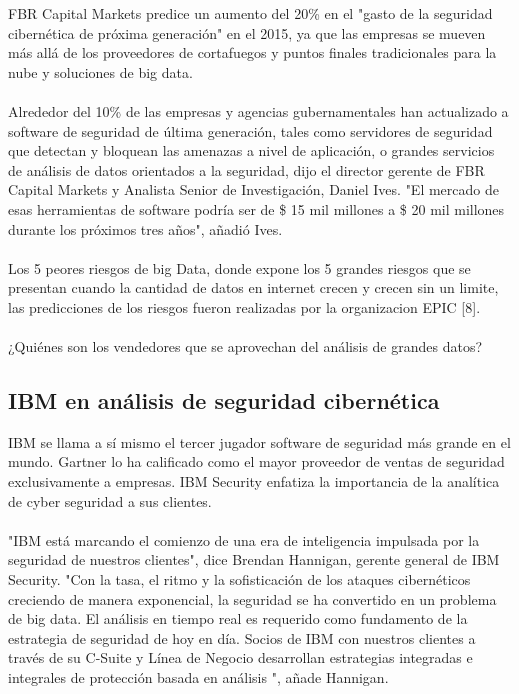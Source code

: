\documentclass[journal]{IEEEtran}
\begin{document}
FBR Capital Markets predice un aumento del 20\% en el "gasto de la seguridad cibernética de próxima generación" en el 2015, ya que las empresas se mueven más allá de los proveedores de cortafuegos y puntos finales tradicionales para la nube y soluciones de big data.\\ \\
Alrededor del 10\% de las empresas y agencias gubernamentales han actualizado a software de seguridad de última generación, tales como servidores de seguridad que detectan y bloquean las amenazas a nivel de aplicación, o grandes servicios de análisis de datos orientados a la seguridad, dijo el director gerente de FBR Capital Markets y Analista Senior de Investigación, Daniel Ives. "El mercado de esas herramientas de software podría ser de \$ 15 mil millones a \$ 20 mil millones durante los próximos tres años", añadió Ives.\\ \\
Los 5 peores riesgos de big Data, donde expone los 5 grandes riesgos que se presentan cuando la cantidad de datos en internet crecen y crecen sin un limite, las predicciones de los riesgos fueron realizadas por la organizacion EPIC [8].\\ \\
¿Quiénes son los vendedores que se aprovechan del análisis de grandes datos?
\subsection{IBM en análisis de seguridad cibernética}
IBM se llama a sí mismo el tercer jugador software de seguridad más grande en el mundo. Gartner lo ha calificado como el mayor proveedor de ventas de seguridad exclusivamente a empresas. IBM Security enfatiza la importancia de la analítica de cyber seguridad a sus clientes.\\ \\
"IBM está marcando el comienzo de una era de inteligencia impulsada por la seguridad de nuestros clientes", dice Brendan Hannigan, gerente general de IBM Security. "Con la tasa, el ritmo y la sofisticación de los ataques cibernéticos creciendo de manera exponencial, la seguridad se ha convertido en un problema de big data. El análisis en tiempo real es requerido como fundamento de la estrategia de seguridad de hoy en día. Socios de IBM con nuestros clientes a través de su C-Suite y Línea de Negocio desarrollan estrategias integradas e integrales de protección basada en análisis ", añade Hannigan.
\end{document}
